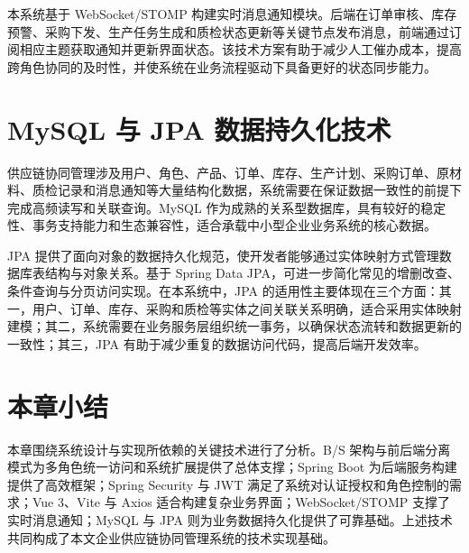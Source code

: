 本系统基于 WebSocket/STOMP 构建实时消息通知模块。后端在订单审核、库存预警、采购下发、生产任务生成和质检状态更新等关键节点发布消息，前端通过订阅相应主题获取通知并更新界面状态。该技术方案有助于减少人工催办成本，提高跨角色协同的及时性，并使系统在业务流程驱动下具备更好的状态同步能力。

\section{MySQL 与 JPA 数据持久化技术}

供应链协同管理涉及用户、角色、产品、订单、库存、生产计划、采购订单、原材料、质检记录和消息通知等大量结构化数据，系统需要在保证数据一致性的前提下完成高频读写和关联查询。MySQL 作为成熟的关系型数据库，具有较好的稳定性、事务支持能力和生态兼容性，适合承载中小型企业业务系统的核心数据\citep{mysql2024}。

JPA 提供了面向对象的数据持久化规范，使开发者能够通过实体映射方式管理数据库表结构与对象关系。基于 Spring Data JPA，可进一步简化常见的增删改查、条件查询与分页访问实现\citep{springdatajpa2024}。在本系统中，JPA 的适用性主要体现在三个方面：其一，用户、订单、库存、采购和质检等实体之间关联关系明确，适合采用实体映射建模；其二，系统需要在业务服务层组织统一事务，以确保状态流转和数据更新的一致性；其三，JPA 有助于减少重复的数据访问代码，提高后端开发效率。

\section{本章小结}

本章围绕系统设计与实现所依赖的关键技术进行了分析。B/S 架构与前后端分离模式为多角色统一访问和系统扩展提供了总体支撑；Spring Boot 为后端服务构建提供了高效框架；Spring Security 与 JWT 满足了系统对认证授权和角色控制的需求；Vue 3、Vite 与 Axios 适合构建复杂业务界面；WebSocket/STOMP 支撑了实时消息通知；MySQL 与 JPA 则为业务数据持久化提供了可靠基础。上述技术共同构成了本文企业供应链协同管理系统的技术实现基础。